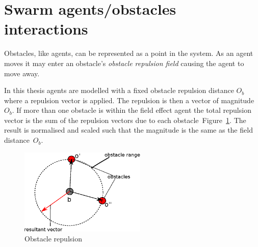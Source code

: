 \section{Swarm agents/obstacles interactions\label{section:ObstacleSection}}
Obstacles, like agents, can be represented as a point in the system. As an agent moves it may enter an obstacle's \textit{obstacle repulsion field} causing the agent to move away.

In this thesis agents are modelled with a fixed obstacle repulsion distance $O_b$ where a repulsion vector is applied. The repulsion is then a vector of magnitude $O_b$. If more than one obstacle is within the field effect agent the total repulsion vector is the sum of the repulsion vectors due to each obstacle~Figure~\ref{methods:Obstacle1}. The result is normalised and scaled such that the magnitude is the same as the field distance~$O_b$.

\begin{figure}[H]
\begin{center}
\includegraphics[width=6cm]{CHAPTER-2/figures/Obstacle1}
\end{center}
\caption{Obstacle repulsion \label{methods:Obstacle1}}
\end{figure}




